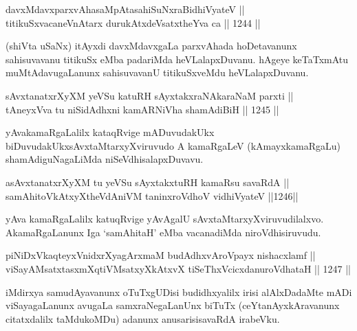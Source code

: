 
\begin{shl}
davxMdavxparxvAhasaMpAtasahiSuNxraBidhiVyateV || \\
titikuSxvacaneVnAtarx durukAtxdeVsatxtheYva ca \hfill || 1244 ||  
\end{shl}

\begin{artha}
(shiVta uSaNx) itAyxdi davxMdavxgaLa parxvAhada hoDetavanunx sahisuvavanu titikuSx eMba padariMda heVLalapxDuvanu. hAgeye keTaTxmAtu muMtAdavugaLanunx sahisuvavanU titikuSxveMdu heVLalapxDuvanu.
\end{artha}

\begin{shl}
sAvxtanatxrXyXM yeVSu katuRH sAyxtakxraNAkaraNaM parxti || \\
tAneyxVva tu niSidAdhxni kamARNiVha shamAdiBiH \hfill || 1245 ||  
\end{shl}

\begin{artha}
yAvakamaRgaLalilx kataqRvige mADuvudakUkx biDuvudakUkx\break sAvxtaMtarxyXviruvudo A kamaRgaLeV (kAmayxkamaRgaLu) shamAdiguNagaLiMda niSeVdhisalapxDuvavu.
\end{artha}

\begin{shl}
asAvxtanatxrXyXM tu yeVSu sAyxtakxtuRH kamaRsu savaRdA || \\
samAhitoVkAtxyX\s theVdAniVM taninxroVdhoV vidhiVyateV \hfill ||1246|| 
\end{shl}

\begin{artha}
yAva kamaRgaLalilx katuqRvige yAvAgalU sAvxtaMtarxyX\-\break viruvudilalxvo. AkamaRgaLanunx Iga `samAhitaH' eMba vacanadiMda niroVdhisiruvudu.
\end{artha}

\begin{shl}
piNiDxVkaqteyxVnidxrXyagArxmaM budAdhxvAroVpayx nishacxlamf || \\
viSayAMsatxtasxmXqtiVMsatxyXkAtxvX tiSeThxVcicxdanuroVdhataH \hfill || 1247 ||  
\end{shl}

\begin{artha}
iMdirxya samudAyavanunx oTuTxgUDisi budidhxyalilx irisi alAlxDadaMte mADi viSayagaLanunx avugaLa samxraNegaLanUnx biTuTx (ceYtanAyxkAravanunx citatxdalilx taMdukoMDu) adanunx anusarisi\break savaRdA irabeVku.
\end{artha}

